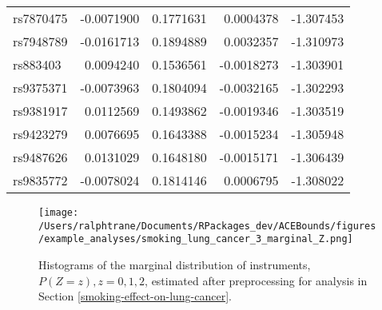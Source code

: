 \documentclass[
]{article}
\theoremstyle{plain}
\begin{document}
\begin{longtable}[t]{lrrrr}
rs7870475 & -0.0071900 & 0.1771631 & 0.0004378 & -1.307453\\
rs7948789 & -0.0161713 & 0.1894889 & 0.0032357 & -1.310973\\
rs883403 & 0.0094240 & 0.1536561 & -0.0018273 & -1.303901\\
rs9375371 & -0.0073963 & 0.1804094 & -0.0032165 & -1.302293\\
\addlinespace
rs9381917 & 0.0112569 & 0.1493862 & -0.0019346 & -1.303519\\
rs9423279 & 0.0076695 & 0.1643388 & -0.0015234 & -1.305948\\
rs9487626 & 0.0131029 & 0.1648180 & -0.0015171 & -1.306439\\
rs9835772 & -0.0078024 & 0.1814146 & 0.0006795 & -1.308022\\*
\end{longtable}

\begin{figure}[H]
  \center
  \texttt{[image: /Users/ralphtrane/Documents/RPackages\_dev/ACEBounds/figures/example\_analyses/smoking\_lung\_cancer\_3\_marginal\_Z.png]}
  \caption{Histograms of the marginal distribution of instruments, $P(Z = z), z=0,1,2$, estimated after preprocessing for analysis in Section \ref{smoking-effect-on-lung-cancer}.}
  \label{fig:marginal-distribution-of-instruments-lung-cancer}
\end{figure}
\end{document}
